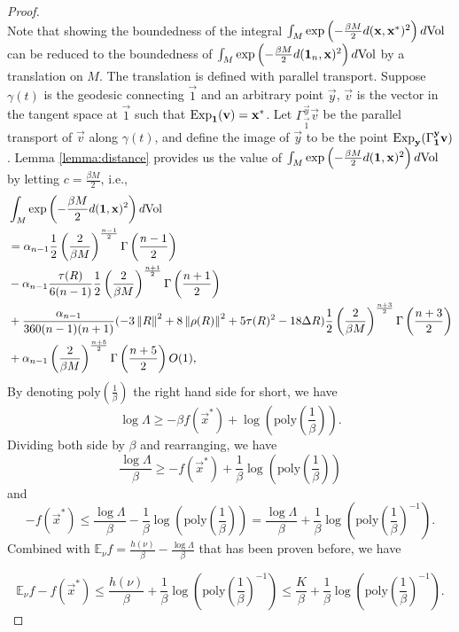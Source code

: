 \begin{proof}
\begin{equation}
\end{equation}
Note that showing the boundedness of the integral $\int_M\exp\left(-\frac{\beta M}{2}d(\mathbf{x},\mathbf{x}^*)^2\right)d\mathrm{Vol}$ can be reduced to the boundedness of $\int_M\exp\left(-\frac{\beta M}{2}d(\mathbf{1}_n,\mathbf{x})^2\right)d\mathrm{Vol}$ by a translation on $M$. The translation is defined with parallel transport. Suppose $\gamma(t)$ is the geodesic connecting $\vec{1}$ and an arbitrary point $\vec{y}$, $\vec{v}$ is the vector in the tangent space at $\vec{1}$ such that $\mathrm{Exp}_{\mathbf{1}}(\mathbf{v})=\mathbf{x}^*$. Let $\Gamma_{\vec{1}}^{\vec{y}}\vec{v}$ be the parallel transport of $\vec{v}$ along $\gamma(t)$, and define the image of $\vec{y}$ to be the point $\mathrm{Exp}_{\mathbf{y}}(\Gamma_{\mathbf{1}}^{\mathbf{y}}\mathbf{v})$.  Lemma \ref{lemma:distance} provides us the value of $\int_M\exp\left(-\frac{\beta M}{2}d(\mathbf{1},\mathbf{x})^2\right)d\mathrm{Vol}$ by letting $c=\frac{\beta M}{2}$, i.e., 
\begin{equation}
\begin{split}
&\int_M\exp\left(-\frac{\beta M}{2}d(\mathbf{1},\mathbf{x})^2\right)d\mathrm{Vol}
\\
&=\alpha_{n-1}\frac{1}{2}\left(\frac{2}{\beta M}\right)^{\frac{n-1}{2}}\Gamma\left(\frac{n-1}{2}\right)
\\
&-\alpha_{n-1}\frac{\tau(R)}{6(n-1)}\frac{1}{2}\left(\frac{2}{\beta M}\right)^{\frac{n+1}{2}}\Gamma\left(\frac{n+1}{2}\right)
\\
&+\frac{\alpha_{n-1}}{360(n-1)(n+1)}(-3\left\Vert R \right\Vert^2+8\left\Vert \rho(R) \right\Vert^2+5\tau(R)^2-18\Delta R)\frac{1}{2}\left(\frac{2}{\beta M}\right)^{\frac{n+3}{2}}\Gamma\left(\frac{n+3}{2}\right)
\\
&+\alpha_{n-1}\left(\frac{2}{\beta M}\right)^{\frac{n+5}{2}}\Gamma\left(\frac{n+5}{2}\right)O(1),
\end{split}
\end{equation}
By denoting $\text{poly}\left(\frac{1}{\beta}\right)$ the right hand side for short, we have
\[
\log\Lambda\ge-\beta f(\vec{x}^*)+\log\left(\text{poly}\left(\frac{1}{\beta}\right)\right).
\]
Dividing both side by $\beta$ and rearranging, we have
\[
\frac{\log \Lambda}{\beta}\ge -f(\vec{x}^*)+\frac{1}{\beta}\log\left(\text{poly}\left(\frac{1}{\beta}\right)\right)
\]
and 
\[
-f(\vec{x}^*)\le\frac{\log\Lambda}{\beta}-\frac{1}{\beta}\log\left(\text{poly}\left(\frac{1}{\beta}\right)\right)=\frac{\log\Lambda}{\beta}+\frac{1}{\beta}\log\left(\text{poly}\left(\frac{1}{\beta}\right)^{-1}\right).
\]
Combined with $\mathbb{E}_{\nu}f=\frac{h(\nu)}{\beta}-\frac{\log\Lambda}{\beta}$ that has been proven before, we have 

\[
\mathbb{E}_{\nu}f-f(\vec{x}^*)\le \frac{h(\nu)}{\beta}+\frac{1}{\beta}\log\left(\text{poly}\left(\frac{1}{\beta}\right)^{-1}\right)\le\frac{K}{\beta}+\frac{1}{\beta}\log\left(\text{poly}\left(\frac{1}{\beta}\right)^{-1}\right).
\]
\end{proof}




